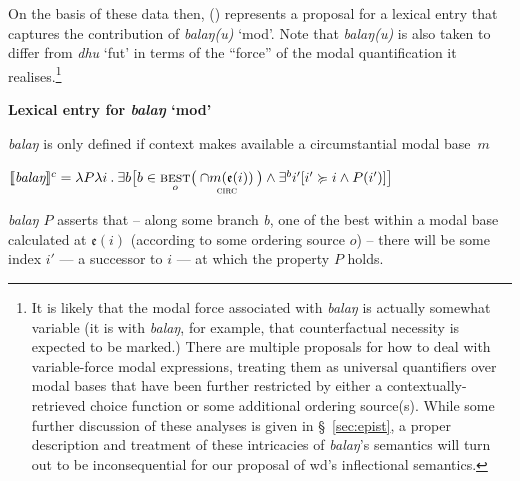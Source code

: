 On the basis of these data then, () represents a proposal for a lexical entry that captures the contribution of \textit{balaŋ(u)} `\gls{mod}'. Note that \textit{balaŋ(u)} is also taken to differ from \textit{dhu} `\gls{fut}' in terms of the ``force'' of the modal quantification it realises.\footnote{It is likely that the modal force associated with \textit{balaŋ} is actually somewhat variable (it is with \textit{balaŋ}, for example, that counterfactual necessity is expected to be marked.) There are multiple proposals for how to deal with variable-force modal expressions, treating them as universal quantifiers over modal bases that have been further restricted by either a contextually-retrieved choice function or some additional ordering source(s). While some further discussion of these analyses is given in \S~\ref{sec:epist}, a proper description and treatment of these intricacies of \textit{balaŋ}'s semantics will turn out to be inconsequential for our proposal of \gls{wd}'s inflectional semantics.} 



\pex \textbf{Lexical entry for \textit{balaŋ} `\gls{mod}'}\par\noindent

\textit{balaŋ} is only defined if context makes available a circumstantial modal base~$ m $

$ \denote[c]{\textit{balaŋ}}=\lambda P\lambda i\mathbin.\exists b\big[b\in\underset{o}{\textsc{best}}\big(\underset{\textsc{circ}}{\cap m(\mathfrak e( i))}\big)\wedge\exists^b i'[i'\succcurlyeq i\wedge P(i')]\big] $

\textit{balaŋ $ P $} %
asserts that -- along some branch \textit{b}, one of the best within a modal base calculated at $\mathfrak{e}(i) $ (according to some ordering source $ o $) -- there will be some  index $ i' $ --- a successor to $ i $ --- at which the property $ P $ holds.

\xe

